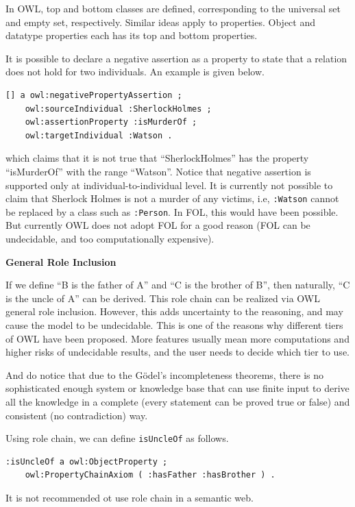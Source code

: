 In OWL, top and bottom classes are defined, corresponding to the universal set and empty set, respectively. Similar ideas apply to properties. Object and datatype properties each has its top and bottom properties.

It is possible to declare a negative assertion as a property to state that a relation does not hold for two individuals. An example is given below.
\begin{lstlisting}
[] a owl:negativePropertyAssertion ;
	owl:sourceIndividual :SherlockHolmes ;
	owl:assertionProperty :isMurderOf ;
	owl:targetIndividual :Watson .
\end{lstlisting}
which claims that it is not true that ``SherlockHolmes'' has the property ``isMurderOf'' with the range ``Watson''. Notice that negative assertion is supported only at individual-to-individual level. It is currently not possible to claim that Sherlock Holmes is not a murder of any victims, i.e, \verb|:Watson| cannot be replaced by a class such as \verb|:Person|. In FOL, this would have been possible. But currently OWL does not adopt FOL for a good reason (FOL can be undecidable, and too computationally expensive).

\vspace{0.1in}
\noindent \textbf{General Role Inclusion}
\vspace{0.1in}

If we define ``B is the father of A'' and ``C is the brother of B'', then naturally, ``C is the uncle of A'' can be derived. This role chain can be realized via OWL general role inclusion. However, this adds uncertainty to the reasoning, and may cause the model to be undecidable. This is one of the reasons why different tiers of OWL have been proposed. More features usually mean more computations and higher risks of undecidable results, and the user needs to decide which tier to use.

And do notice that due to the G\"odel's incompleteness theorems, there is no sophisticated enough system or knowledge base that can use finite input to derive all the knowledge in a complete (every statement can be proved true or false) and consistent (no contradiction) way.

Using role chain, we can define \verb|isUncleOf| as follows.
\begin{lstlisting}
:isUncleOf a owl:ObjectProperty ;
	owl:PropertyChainAxiom ( :hasFather :hasBrother ) .
\end{lstlisting}

It is not recommended ot use role chain in a semantic web.

